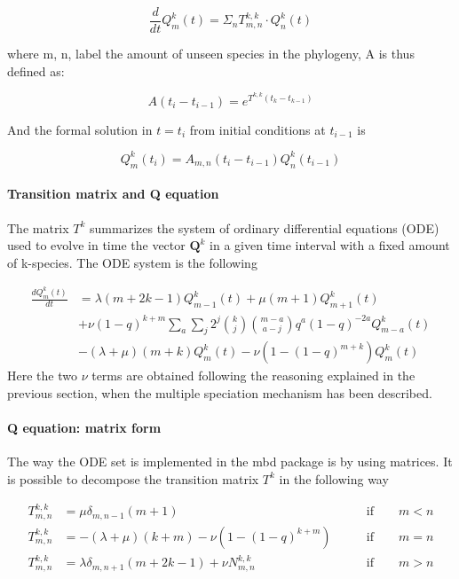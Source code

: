 \documentclass[]{article}
\let\oldparagraph\paragraph
\renewcommand{\paragraph}[1]{\oldparagraph{#1}\mbox{}}
\begin{document}
\[
\frac{d}{dt}Q^k_m(t) = \Sigma_n T^{k,k}_{m,n} \cdot Q^k_n(t)
\]

where m, n, label the amount of unseen species in the phylogeny,
A is thus defined as:

\[
A(t_i - t_{i-1}) = e^{T^{k,k}(t_k - t_{k-1})}
\]

And the formal solution in \(t = t_{i}\) from initial conditions at \(t_{i - 1}\) is

\[
Q^k_m(t_{i}) = A_{m,n}(t_i - t_{i-1}) Q^k_n(t_{i - 1})
\]

\hypertarget{transition-matrix-and-q-equation}{%
\paragraph{Transition matrix and Q equation}\label{transition-matrix-and-q-equation}}

The matrix \(T^k\) summarizes the system of ordinary differential equations (ODE)
used to evolve in time the vector \(\mathbf{Q}^k\) in a given time interval with
a fixed amount of k-species. The ODE system is the following

\[
\begin{aligned}
\frac{d Q^k_m(t)}{dt} & = 
\lambda (m + 2k - 1) Q^k_{m - 1}(t) +
\mu (m + 1) Q^k_{m + 1}(t) \\
& + \nu (1 - q) ^ {k + m} 
\sum_{a}
\sum_{j} 2 ^ {j} \binom{k}{j} \binom{m - a}{a - j} q ^ {a} (1 - q) ^ {- 2a}
Q^k_{m - a}(t) \\
& - (\lambda + \mu) (m + k) Q^k_{m}(t)
- \nu (1 - (1 - q) ^ {m + k}) Q^k_{m}(t)
\end{aligned}
\]
Here the two \(\nu\) terms are obtained following the reasoning explained in the
previous section, when the multiple speciation mechanism has been described.

\hypertarget{q-equation-matrix-form}{%
\paragraph{Q equation: matrix form}\label{q-equation-matrix-form}}

The way the ODE set is implemented in the mbd package is by using matrices.
It is possible to decompose the transition matrix \(T^k\) in the following way

\[
\begin{aligned}
T^{k,k}_{m,n} & =
\mu \delta_{m, n - 1} (m + 1)
\qquad & \text{if} \qquad
m < n
\\
T^{k,k}_{m,n} & =
- (\lambda + \mu) (k + m)
- \nu (1 - (1 - q) ^ {k + m}) 
\qquad & \text{if} \qquad
m = n
\\
T^{k,k}_{m,n} & =
\lambda \delta_{m, n + 1} (m + 2k - 1) +
\nu N^{k,k}_{m,n}
\qquad & \text{if} \qquad
m > n
\end{aligned}
\]
\end{document}
